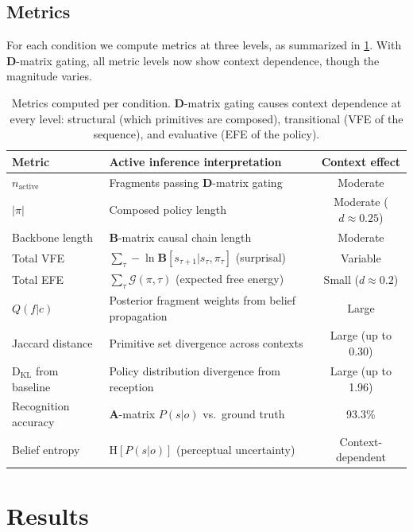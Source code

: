 \documentclass[11pt,a4paper]{article}
\newcommand{\efe}{\mathcal{G}}
\newcommand{\A}{\mathbf{A}}
\newcommand{\B}{\mathbf{B}}
\newcommand{\D}{\mathbf{D}}
\newcommand{\KL}{\mathrm{D}_{\mathrm{KL}}}
\newcommand{\HH}{\mathrm{H}}
\begin{document}
\subsection{Metrics}

For each condition we compute metrics at three levels, as summarized in \cref{tab:metrics}.  With $\D$-matrix gating, all metric levels now show context dependence, though the magnitude varies.

\begin{table}[H]
\centering
\small
\begin{tabular}{llc}
\toprule
Metric & Active inference interpretation & Context effect \\
\midrule
$n_{\text{active}}$ & Fragments passing $\D$-matrix gating & Moderate \\
$|\pi|$ & Composed policy length & Moderate ($d \approx 0.25$) \\
Backbone length & $\B$-matrix causal chain length & Moderate \\
Total VFE & $\sum_\tau -\ln \B[s_{\tau+1}|s_\tau, \pi_\tau]$ (surprisal) & Variable \\
Total EFE & $\sum_\tau \efe(\pi, \tau)$ (expected free energy) & Small ($d \approx 0.2$) \\
$Q(f|c)$ & Posterior fragment weights from belief propagation & Large \\
Jaccard distance & Primitive set divergence across contexts & Large (up to 0.30) \\
$\KL$ from baseline & Policy distribution divergence from reception & Large (up to 1.96) \\
Recognition accuracy & $\A$-matrix $P(s|o)$ vs.\ ground truth & 93.3\% \\
Belief entropy & $\HH[P(s|o)]$ (perceptual uncertainty) & Context-dependent \\
\bottomrule
\end{tabular}
\caption{Metrics computed per condition.  $\D$-matrix gating causes context dependence at every level: structural (which primitives are composed), transitional (VFE of the sequence), and evaluative (EFE of the policy).}
\label{tab:metrics}
\end{table}


\section{Results}
\label{sec:results}
\end{document}
